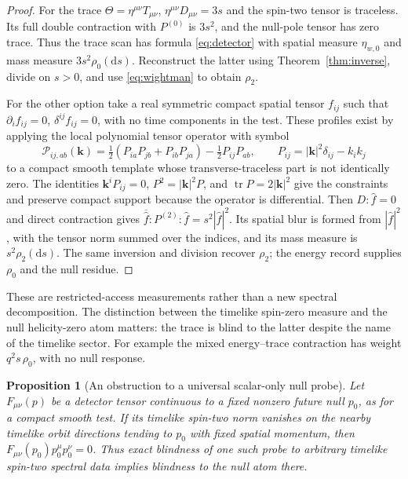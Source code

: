 \documentclass[11pt]{article}
\newtheorem{proposition}[theorem]{Proposition}
\theoremstyle{remark}
\newcommand{\dd}{\mathrm d}
\begin{document}
\begin{proof}
For the trace \(\Theta=\eta^{\mu\nu}T_{\mu\nu}\),
\(\eta^{\mu\nu}D_{\mu\nu}=3s\) and the spin-two tensor is
traceless. Its full double contraction with \(P^{(0)}\)
is \(3s^2\), and the null-pole tensor has zero trace.
Thus the trace scan has formula \eqref{eq:detector} with
spatial measure \(\eta_{w,0}\) and mass measure
\(3s^2\rho_0(\dd s)\). Reconstruct the latter using
Theorem~\ref{thm:inverse}, divide on \(s>0\), and use
\eqref{eq:wightman} to obtain \(\rho_2\).

For the other option take a real symmetric compact spatial tensor
\(f_{ij}\) such that \(\partial_i f_{ij}=0\),
\(\delta^{ij}f_{ij}=0\), with no time components in the test.
These profiles exist by applying the local polynomial tensor
operator with symbol
\[
 \mathcal P_{ij,ab}(\mathbf k)=
  \tfrac12(P_{ia}P_{jb}+P_{ib}P_{ja})-\tfrac12P_{ij}P_{ab},
 \qquad P_{ij}=|\mathbf k|^2\delta_{ij}-k_i k_j
\]
to a compact smooth template whose transverse-traceless part
is not identically zero. The identities
\(\mathbf k^iP_{ij}=0\), \(P^2=|\mathbf k|^2P\),
and \(\operatorname{tr}P=2|\mathbf k|^2\) give the constraints
and preserve compact support because the operator is differential.
Then \(D:\widehat f=0\) and direct contraction gives
\(\overline{\widehat f}:P^{(2)}:\widehat f
=s^2|\widehat f|^2\). Its spatial blur is formed from
\(|\widehat f|^2\), with the tensor norm summed over the indices,
and its mass measure is \(s^2\rho_2(\dd s)\).
The same inversion and division recover \(\rho_2\); the energy
record supplies \(\rho_0\) and the null residue.
\end{proof}

These are restricted-access measurements rather than a new
spectral decomposition. The distinction between the timelike
spin-zero measure and the null helicity-zero atom matters:
the trace is blind to the latter despite the name of the
timelike sector. For example the mixed energy--trace contraction
has weight \(q^2s\,\rho_0\), with no null response.

\begin{proposition}[An obstruction to a universal scalar-only null probe]
\label{thm:nullblind}
Let \(F_{\mu\nu}(p)\) be a detector tensor continuous to a fixed
nonzero future null \(p_0\), as for a compact smooth test. If
its timelike spin-two norm vanishes on the nearby timelike
orbit directions tending to \(p_0\) with fixed spatial momentum,
then \(F_{\mu\nu}(p_0)p_0^\mu p_0^\nu=0\).
Thus exact blindness of one such probe to arbitrary timelike
spin-two spectral data implies blindness to the null atom there.
\end{proposition}
\end{document}
